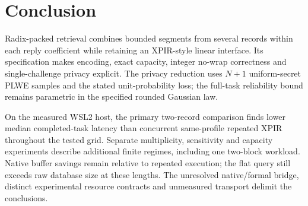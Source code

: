 \section{Conclusion}
\label{sec:conclusion}
Radix-packed retrieval combines bounded segments from several records
within each reply coefficient while retaining an XPIR-style linear
interface. Its specification makes encoding, exact capacity, integer
no-wrap correctness and single-challenge privacy explicit. The privacy
reduction uses \(N+1\) uniform-secret PLWE samples and the stated
unit-probability loss; the full-task reliability bound remains parametric
in the specified rounded Gaussian law.

On the measured WSL2 host, the primary two-record comparison finds lower
median completed-task latency than concurrent same-profile repeated XPIR
throughout the tested grid. Separate multiplicity, sensitivity and
capacity experiments describe additional finite regimes, including one
two-block workload. Native buffer savings remain relative to repeated
execution; the flat query still exceeds raw database size at these lengths.
The unresolved native/formal bridge, distinct experimental resource
contracts and unmeasured transport delimit the conclusions.
